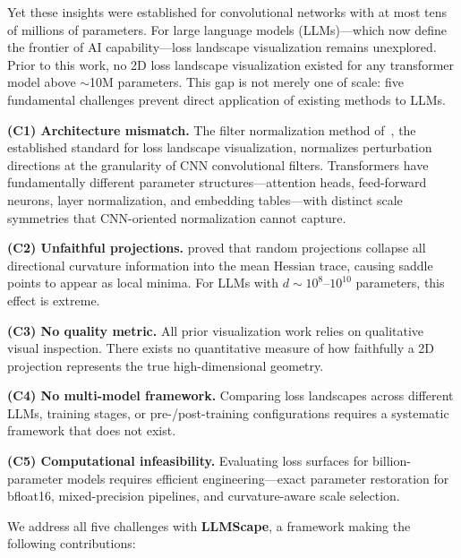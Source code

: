 \documentclass{article}
\begin{document}
Yet these insights were established for convolutional networks with at most tens of millions of parameters. For large language models (LLMs)---which now define the frontier of AI capability---loss landscape visualization remains unexplored. Prior to this work, no 2D loss landscape visualization existed for any transformer model above $\sim$10M parameters. This gap is not merely one of scale: five fundamental challenges prevent direct application of existing methods to LLMs.

\textbf{(C1) Architecture mismatch.} The filter normalization method of~\citet{li2018visualizing}, the established standard for loss landscape visualization, normalizes perturbation directions at the granularity of CNN convolutional filters. Transformers have fundamentally different parameter structures---attention heads, feed-forward neurons, layer normalization, and embedding tables---with distinct scale symmetries that CNN-oriented normalization cannot capture.

\textbf{(C2) Unfaithful projections.} \citet{bottcher2024visualizing} proved that random projections collapse all directional curvature information into the mean Hessian trace, causing saddle points to appear as local minima. For LLMs with $d \sim 10^{8}$--$10^{10}$ parameters, this effect is extreme.

\textbf{(C3) No quality metric.} All prior visualization work relies on qualitative visual inspection. There exists no quantitative measure of how faithfully a 2D projection represents the true high-dimensional geometry.

\textbf{(C4) No multi-model framework.} Comparing loss landscapes across different LLMs, training stages, or pre-/post-training configurations requires a systematic framework that does not exist.

\textbf{(C5) Computational infeasibility.} Evaluating loss surfaces for billion-parameter models requires efficient engineering---exact parameter restoration for bfloat16, mixed-precision pipelines, and curvature-aware scale selection.

We address all five challenges with \textbf{LLMScape}, a framework making the following contributions:
\end{document}
